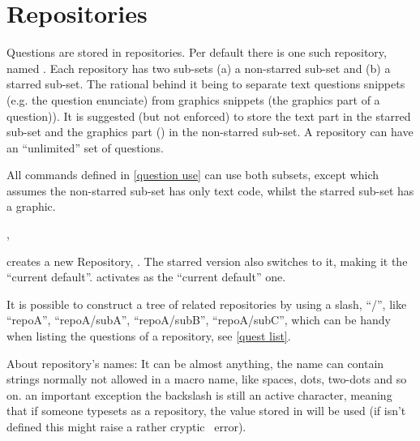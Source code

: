 \documentclass[10pt]{article}
\begin{document}
\section{Repositories}\label{repositories}
Questions are stored in repositories. Per default there is one such repository, named . Each repository has two sub-sets (a) a non-starred sub-set and (b) a starred sub-set. The rational behind it being to separate text questions snippets (e.g. the question enunciate) from graphics snippets (the graphics part of a question)). It is suggested (but not enforced) to store the text part in the starred sub-set and the graphics part () in the non-starred sub-set. A repository can have an ``unlimited'' set of questions. 
\begin{tsremark}
  All commands defined in \ref{question use} can use both subsets, except \tsobj{\QuestionsList} which assumes the non-starred sub-set has only text code, whilst the starred sub-set has a  graphic.
\end{tsremark}

\begin{codedescribe}[code,update=2025/10/01]{,\SelectRepository}
\begin{codesyntax}%
\end{codesyntax}
 creates a new Repository, . The starred version also switches to it, making it the ``current default''.
\tsobj{\SelectRepository} activates  as the ``current default'' one.

It is possible to construct a tree of related repositories by using a slash, ``/'', like ``repoA'', ``repoA/subA'', ``repoA/subB'', ``repoA/subC'', which can be handy when listing the questions of a repository, see \ref{quest list}.
\end{codedescribe}

\begin{tsremark}
About repository's names: It can be almost anything, the name can contain strings normally not allowed in a macro name, like spaces, dots, two-dots and so on. an important exception the backslash is still an active character, meaning that if someone typesets \tsobj{\XYZ} as a repository, the value stored in \tsobj{\XYZ} will be used (if \tsobj{\XYZ} isn't defined this might raise a rather cryptic \LaTeXe\ error).
\end{tsremark}
\end{document}
